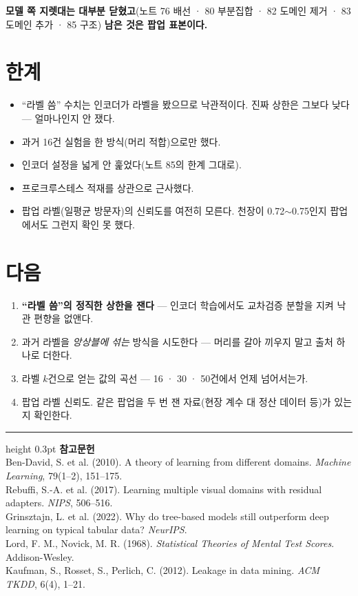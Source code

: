 \documentclass[10pt]{article}
\begin{document}
\textbf{모델 쪽 지렛대는 대부분 닫혔고}(노트 76 배선 · 80 부분집합 · 82 도메인
제거 · 83 도메인 추가 · 85 구조) \textbf{남은 것은 팝업 표본이다.}

\section{한계}

\begin{itemize}[leftmargin=1.1em,itemsep=0.15em]
\item ``라벨 씀'' 수치는 인코더가 라벨을 봤으므로 낙관적이다. 진짜 상한은
      그보다 낮다 --- 얼마나인지 안 쟀다.
\item 과거 16건 실험을 한 방식(머리 적합)으로만 했다.
\item 인코더 설정을 넓게 안 훑었다(노트 85의 한계 그대로).
\item 프로크루스테스 적재를 상관으로 근사했다.
\item 팝업 라벨(일평균 방문자)의 신뢰도를 여전히 모른다. 천장이 0.72$\sim$0.75인지
      팝업에서도 그런지 확인 못 했다.
\end{itemize}

\section{다음}

\begin{enumerate}[leftmargin=1.3em,itemsep=0.15em]
\item \textbf{``라벨 씀''의 정직한 상한을 잰다} --- 인코더 학습에서도 교차검증
      분할을 지켜 낙관 편향을 없앤다.
\item 과거 라벨을 \emph{앙상블에 섞는} 방식을 시도한다 --- 머리를 갈아 끼우지
      말고 출처 하나로 더한다.
\item 라벨 $k$건으로 얻는 값의 곡선 --- 16 · 30 · 50건에서 언제 넘어서는가.
\item 팝업 라벨 신뢰도. 같은 팝업을 두 번 잰 자료(현장 계수 대 정산 데이터 등)가
      있는지 확인한다.
\end{enumerate}

\vspace{0.6em}
\hrule height 0.3pt
\vspace{0.5em}
{\footnotesize
\textbf{참고문헌}\\[0.3em]
Ben-David, S. et al. (2010). A theory of learning from different domains.
\emph{Machine Learning}, 79(1--2), 151--175.\\[0.15em]
Rebuffi, S.-A. et al. (2017). Learning multiple visual domains with residual
adapters. \emph{NIPS}, 506--516.\\[0.15em]
Grinsztajn, L. et al. (2022). Why do tree-based models still outperform deep
learning on typical tabular data? \emph{NeurIPS}.\\[0.15em]
Lord, F. M., Novick, M. R. (1968). \emph{Statistical Theories of Mental Test
Scores}. Addison-Wesley.\\[0.15em]
Kaufman, S., Rosset, S., Perlich, C. (2012). Leakage in data mining.
\emph{ACM TKDD}, 6(4), 1--21.
}
\end{document}
